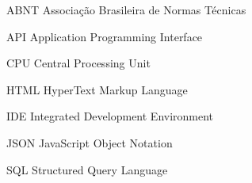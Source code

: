 
\begin{siglas}
	
	\item[ABNT] Associação Brasileira de Normas Técnicas
	\item[API] Application Programming Interface
	\item[CPU] Central Processing Unit
	\item[HTML] HyperText Markup Language
	\item[IDE] Integrated Development Environment
	\item[JSON] JavaScript Object Notation
	\item[SQL] Structured Query Language
	
\end{siglas}